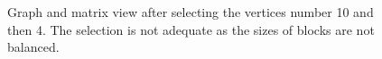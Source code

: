 \documentclass[12pt, oneside]{book}
\begin{document}
\begin{figure}[t]
\centering
{}%
\caption{Graph and matrix view after selecting the vertices number 10 and then 4. The selection is not adequate as the sizes of blocks are not balanced.}
\label{selected410}
\end{figure}
\end{document}
